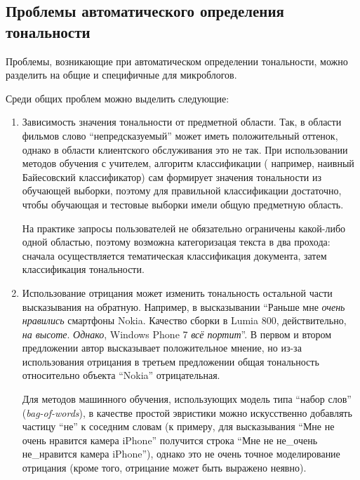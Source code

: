 \subsection{Проблемы автоматического определения тональности}

Проблемы, возникающие при автоматическом определении тональности, можно 
разделить на общие и специфичные для микроблогов.

\vspace{0.5cm}

Среди общих проблем можно выделить следующие:

\begin{enumerate}

\item 
Зависимость значения тональности от предметной области. Так, в области 
фильмов слово ``непредсказуемый'' может иметь положительный оттенок, 
однако в области клиентского обслуживания это не так.
При использовании методов обучения с учителем, алгоритм классификации (
например, наивный Байесовский классификатор) сам формирует значения 
тональности из обучающей выборки, поэтому для правильной классификации 
достаточно, чтобы обучающая и тестовые выборки имели общую предметную 
область.

На практике запросы пользователей не обязательно ограничены
какой-либо одной областью, поэтому возможна категоризацая текста в два 
прохода: сначала осуществляется тематическая классификация 
документа, затем классификация тональности.

\item 
Использование отрицания может изменить тональность остальной части 
высказывания на обратную. 
Например, в высказывании ``Раньше мне \textit{очень нравились} смартфоны Nokia. Качество сборки в Lumia 800, действительно, \textit{на высоте}. \textit{Однако}, Windows Phone 7 \textit{всё портит}''. 
В первом и втором предложении автор высказывает положительное мнение, но 
из-за использования отрицания в третьем предложении общая тональность 
относительно объекта ``Nokia'' отрицательная. 

Для методов машинного обучения, использующих модель 
типа ``набор слов'' (\textit{bag-of-words}), 	в качестве простой эвристики можно 
искусственно добавлять частицу ``не'' к соседним словам (к примеру, для 
высказывания ``Мне не очень нравится камера iPhone'' получится строка 
``Мне не не\_очень не\_нравится камера iPhone''), однако это не очень точное моделирование отрицания (кроме того, отрицание может быть выражено неявно).	


\end{enumerate}
